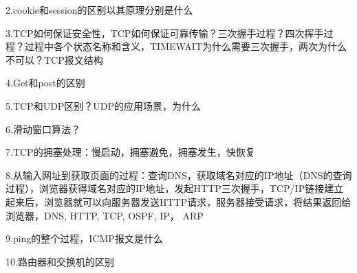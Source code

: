 2.cookie和session的区别以其原理分别是什么

3.TCP如何保证安全性，TCP如何保证可靠传输？三次握手过程？四次挥手过程？过程中各个状态名称和含义，TIMEWAIT为什么需要三次握手，两次为什么不可以？TCP报文结构

4.Get和post的区别

5.TCP和UDP区别？UDP的应用场景，为什么

6.滑动窗口算法？

7.TCP的拥塞处理：慢启动，拥塞避免，拥塞发生，快恢复

8.从输入网址到获取页面的过程：查询DNS，获取域名对应的IP地址（DNS的查询过程），浏览器获得域名对应的IP地址，发起HTTP三次握手，TCP/IP链接建立起来后，浏览器就可以向服务器发送HTTP请求，服务器接受请求，将结果返回给浏览器，DNS, HTTP, TCP, OSPF, IP， ARP

9.ping的整个过程，ICMP报文是什么

10.路由器和交换机的区别



